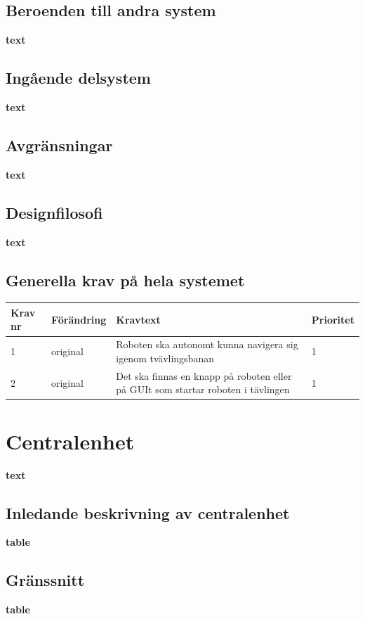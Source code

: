 \documentclass[a4paper,titlepage,12pt]{article}
\begin{document}
	\subsection{Beroenden  till andra system}
	\textbf{text}
	\subsection{Ingående delsystem}
	\textbf{text}
	\subsection{Avgränsningar}
	\textbf{text}
	\subsection{Designfilosofi}
	\textbf{text}
	\subsection{Generella krav på hela systemet}

	\begin{table}[h!]
		\label{tab:label}
		\begin{tabularx}{\textwidth}{|l|l|X|l|}
		\hline
		\textbf{Krav nr} & \textbf{Förändring} & \textbf{Kravtext} & \textbf{Prioritet} 
				\\ \hline
	
		1 & original & Roboten ska autonomt kunna navigera sig igenom tvävlingsbanan & 1
				\\ \hline

		2 & original & Det ska finnas en knapp på roboten eller på GUIt som startar
			roboten i tävlingen& 1
			\\ \hline
		\end{tabularx}
	\end{table}

	\section{Centralenhet}
	\textbf{text}
	\subsection{Inledande beskrivning av centralenhet}
	\textbf{table}
	\subsection{Gränssnitt}
	\textbf{table}
\end{document}
